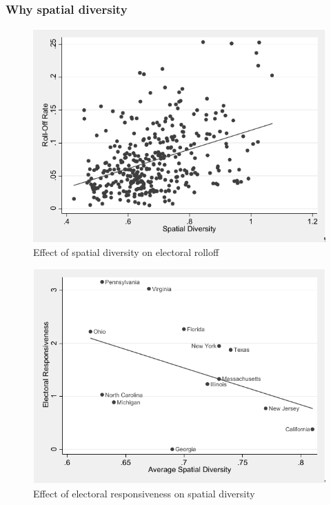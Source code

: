 \documentclass[]{article}
\begin{document}
\hypertarget{why-spatial-diversity}{%
\subsubsection{Why spatial diversity}\label{why-spatial-diversity}}

\begin{figure}
\centering
\includegraphics{img/sd_rolloff.png}
\caption{Effect of spatial diversity on electoral rolloff}
\end{figure}

\begin{figure}
\centering
\includegraphics{./img/average_spatial-diversity.png}
\caption{Effect of electoral responsiveness on spatial diversity}
\end{figure}
\end{document}
